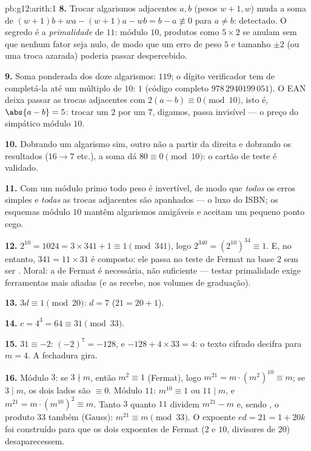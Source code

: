 \begin{solution}{pb:g12:arith:1}
\textbf{8.} Trocar algarismos adjacentes $a, b$ (pesos
$w + 1, w$) muda a soma de
$(w+1)b + wa - (w+1)a - wb = b - a \not\equiv 0$ para
$a \neq b$: detectado. O segredo é a \emph{primalidade} de
$11$: módulo $10$, produtos como $5 \times 2$ se anulam sem que
nenhum fator seja nulo, de modo que um erro de peso $5$ e
tamanho $\pm 2$ (ou uma troca azarada) poderia passar
despercebido.

\textbf{9.} Soma ponderada dos doze algarismos: $119$; o dígito
verificador tem de completá-la até um múltiplo de $10$: $1$
(código completo $978\,2940199\,051$). O EAN deixa passar as
trocas adjacentes com $2(a - b) \equiv 0 \pmod{10}$, isto é,
$\abs{a - b} = 5$: trocar um $2$ por um $7$, digamos, passa
invisível --- o preço do simpático módulo $10$.

\textbf{10.} Dobrando um algarismo sim, outro não a partir da
direita e dobrando os resultados ($16 \to 7$ etc.), a soma dá
$80 \equiv 0 \pmod{10}$: o cartão de teste é validado.

\textbf{11.} Com um módulo primo todo peso é invertível, de
modo que \emph{todos} os erros simples e \emph{todas} as trocas
adjacentes são apanhados --- o luxo do ISBN; os esquemas módulo
$10$ mantêm algarismos amigáveis e aceitam um pequeno ponto
cego.

\textbf{12.} $2^{10} = 1024 = 3 \times 341 + 1 \equiv 1
\pmod{341}$, logo $2^{340} = \left(2^{10}\right)^{34} \equiv
1$. E, no entanto, $341 = 11 \times 31$ é composto: ele passa no
teste de Fermat na base $2$ sem ser . Moral: a 
de Fermat é necessária, não suficiente --- testar primalidade
exige ferramentas mais afiadas (e as recebe, nos volumes de
graduação).

\textbf{13.} $3d \equiv 1 \pmod{20}$: $d = 7$
($21 = 20 + 1$).

\textbf{14.} $c = 4^3 = 64 \equiv 31 \pmod{33}$.

\textbf{15.} $31 \equiv -2$: $(-2)^7 = -128$, e
$-128 + 4 \times 33 = 4$: o texto cifrado decifra para
$m = 4$. A fechadura gira.

\textbf{16.} Módulo $3$: se $3 \nmid m$, então
$m^2 \equiv 1$ (Fermat), logo
$m^{21} = m \cdot \left(m^2\right)^{10} \equiv m$; se
$3 \mid m$, os dois lados são $\equiv 0$. Módulo $11$:
$m^{10} \equiv 1$ ou $11 \mid m$, e
$m^{21} = m \cdot \left(m^{10}\right)^2 \equiv m$. Tanto $3$
quanto $11$ dividem $m^{21} - m$ e, sendo , o
produto $33$ também  (Gauss):
$m^{21} \equiv m \pmod{33}$. O expoente $ed = 21 = 1 + 20k$ foi
construído para que os dois expoentes de Fermat ($2$ e $10$,
divisores de $20$) desaparecessem.


\end{solution}
